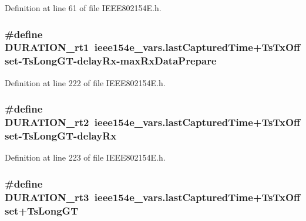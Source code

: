 Definition at line 61 of file I\+E\+E\+E802154\+E.\+h.

\subsubsection[{\texorpdfstring{D\+U\+R\+A\+T\+I\+O\+N\+\_\+rt1}{DURATION_rt1}}]{\setlength{\rightskip}{0pt plus 5cm}\#define D\+U\+R\+A\+T\+I\+O\+N\+\_\+rt1~ieee154e\+\_\+vars.\+last\+Captured\+Time+{\bf Ts\+Tx\+Offset}-\/{\bf Ts\+Long\+GT}-\/{\bf delay\+Rx}-\/{\bf max\+Rx\+Data\+Prepare}}\hypertarget{group___i_e_e_e802154_e_ga17007fd0eb9234ff1a5127b3b3f34a05}{}\label{group___i_e_e_e802154_e_ga17007fd0eb9234ff1a5127b3b3f34a05}


Definition at line 222 of file I\+E\+E\+E802154\+E.\+h.

\subsubsection[{\texorpdfstring{D\+U\+R\+A\+T\+I\+O\+N\+\_\+rt2}{DURATION_rt2}}]{\setlength{\rightskip}{0pt plus 5cm}\#define D\+U\+R\+A\+T\+I\+O\+N\+\_\+rt2~ieee154e\+\_\+vars.\+last\+Captured\+Time+{\bf Ts\+Tx\+Offset}-\/{\bf Ts\+Long\+GT}-\/{\bf delay\+Rx}}\hypertarget{group___i_e_e_e802154_e_gae79c34a80e9dda3a5209a748db93e901}{}\label{group___i_e_e_e802154_e_gae79c34a80e9dda3a5209a748db93e901}


Definition at line 223 of file I\+E\+E\+E802154\+E.\+h.

\subsubsection[{\texorpdfstring{D\+U\+R\+A\+T\+I\+O\+N\+\_\+rt3}{DURATION_rt3}}]{\setlength{\rightskip}{0pt plus 5cm}\#define D\+U\+R\+A\+T\+I\+O\+N\+\_\+rt3~ieee154e\+\_\+vars.\+last\+Captured\+Time+{\bf Ts\+Tx\+Offset}+{\bf Ts\+Long\+GT}}\hypertarget{group___i_e_e_e802154_e_gaa9e952a325e6baa1ea93a1eb8f166387}{}\label{group___i_e_e_e802154_e_gaa9e952a325e6baa1ea93a1eb8f166387}


